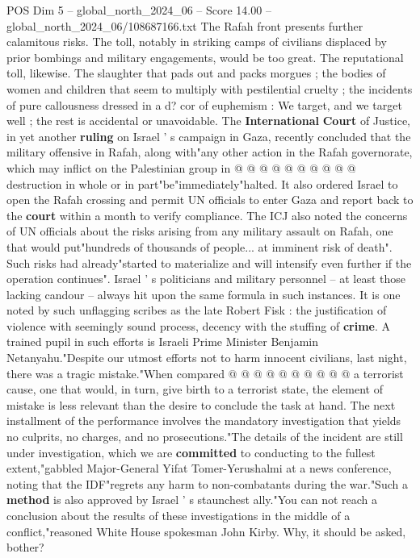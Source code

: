 \begin{textsample}{POS Dim 5 – global\_north\_2024\_06 – Score 14.00 – global\_north\_2024\_06/108687166.txt}
The Rafah front presents further calamitous risks.
The toll, notably in striking camps of civilians displaced by prior bombings and military engagements, would be too great.
The reputational toll, likewise.
The slaughter that pads out and packs morgues ; the bodies of women and children that seem to multiply with pestilential cruelty ; the incidents of pure callousness dressed in a d? cor of euphemism : We target, and we target well ; the rest is accidental or unavoidable.
The \textbf{International} \textbf{Court} of Justice, in yet another \textbf{ruling} on Israel ' s campaign in Gaza, recently concluded that the military offensive in Rafah, along with"any other action in the Rafah governorate, which may inflict on the Palestinian group in @ @ @ @ @ @ @ @ @ @ destruction in whole or in part"be"immediately"halted.
It also ordered Israel to open the Rafah crossing and permit UN officials to enter Gaza and report back to the \textbf{court} within a month to verify compliance.
The ICJ also noted the concerns of UN officials about the risks arising from any military assault on Rafah, one that would put"hundreds of thousands of people... at imminent risk of death".
Such risks had already"started to materialize and will intensify even further if the operation continues".
Israel ' s politicians and military personnel -- at least those lacking candour -- always hit upon the same formula in such instances.
It is one noted by such unflagging scribes as the late Robert Fisk : the justification of violence with seemingly sound process, decency with the stuffing of \textbf{crime}.
A trained pupil in such efforts is Israeli Prime Minister Benjamin Netanyahu."Despite our utmost efforts not to harm innocent civilians, last night, there was a tragic mistake."When compared @ @ @ @ @ @ @ @ @ @ a terrorist cause, one that would, in turn, give birth to a terrorist state, the element of mistake is less relevant than the desire to conclude the task at hand.
The next installment of the performance involves the mandatory investigation that yields no culprits, no charges, and no prosecutions."The details of the incident are still under investigation, which we are \textbf{committed} to conducting to the fullest extent,"gabbled Major-General Yifat Tomer-Yerushalmi at a news conference, noting that the IDF"regrets any harm to non-combatants during the war."Such a \textbf{method} is also approved by Israel ' s staunchest ally."You can not reach a conclusion about the results of these investigations in the middle of a conflict,"reasoned White House spokesman John Kirby.
Why, it should be asked, bother?

\end{textsample}
